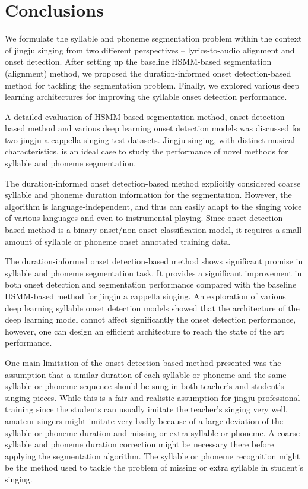 \section{Conclusions}

We formulate the syllable and phoneme segmentation problem within the context of jingju singing from two different perspectives -- lyrics-to-audio alignment and onset detection. After setting up the baseline \gls{HSMM}-based segmentation (alignment) method, we proposed the duration-informed onset detection-based method for tackling the segmentation problem. Finally, we explored various deep learning architectures for improving the syllable onset detection performance.

A detailed evaluation of \gls{HSMM}-based segmentation method, onset detection-based method and various deep learning onset detection models was discussed for two jingju a cappella singing test datasets. Jingju singing, with distinct musical characteristics, is an ideal case to study the performance of novel methods for syllable and phoneme segmentation.

The duration-informed onset detection-based method explicitly considered coarse syllable and phoneme duration information for the segmentation. However, the algorithm is language-independent, and thus can easily adapt to the singing voice of various languages and even to instrumental playing. Since onset detection-based method is a binary onset/non-onset classification model, it requires a small amount of syllable or phoneme onset annotated training data.

The duration-informed onset detection-based method shows significant promise in syllable and phoneme segmentation task. It provides a significant improvement in both onset detection and segmentation performance compared with the baseline \gls{HSMM}-based method for jingju a cappella singing. An exploration of various deep learning syllable onset detection models showed that the architecture of the deep learning model cannot affect significantly the onset detection performance, however, one can design an efficient architecture to reach the state of the art performance.

One main limitation of the onset detection-based method presented was the assumption that a similar duration of each syllable or phoneme and the same syllable or phoneme sequence should be sung in both teacher's and student's singing pieces. While this is a fair and realistic assumption for jingju professional training since the students can usually imitate the teacher's singing very well, amateur singers might imitate very badly because of a large deviation of the syllable or phoneme duration and missing or extra syllable or phoneme. A coarse syllable and phoneme duration correction might be necessary there before applying the segmentation algorithm. The syllable or phoneme recognition might be the method used to tackle the problem of missing or extra syllable in student's singing.

